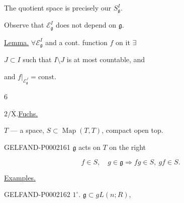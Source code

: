 The quotient space is precisely our $S_{\mathfrak g}^I$.



Observe that $\mathcal E_{\mathfrak g}^I$ does not depend on $\mathfrak g$.



\underline{Lemma.} $\forall\mathcal E_{\mathfrak g}^I$ and a cont. function $f$ on it $\exists$



$J\subset I$ such that $I\setminus J$ is at most countable, and



and $\left.f\right|_{\mathcal E_{\mathfrak g}^J}=\mathrm{const}$.





\begin{flushright}$6$\end{flushright}



$2/\overline{\underline{\mathrm X}}$.\quad\underline{\underline{Fuchs.}}



$T$ --- a space, $S\subset\operatorname{Map}(T, T)$, compact open top.



\begin{GelfandAdjacentEvidence}{GELFAND-P000216}{1}
$\mathfrak g$ acts on $T$ on the right
\end{GelfandAdjacentEvidence}

\begin{equation*}f\in S,\quad g\in\mathfrak g\Rightarrow fg\in S,\ gf\in S.\end{equation*}



\underline{Examples.}



\begin{GelfandAdjacentEvidence}{GELFAND-P000216}{2}
$1^{\circ}$. $\mathfrak g\subset gL (n; R)$,
\end{GelfandAdjacentEvidence}

